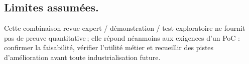 \subsection{Limites assumées.}
Cette combinaison revue-expert / démonstration / test exploratoire ne fournit
pas de preuve quantitative ; elle répond néanmoins aux exigences d’un PoC :
confirmer la faisabilité, vérifier l’utilité métier et recueillir des pistes
d’amélioration avant toute industrialisation future.
